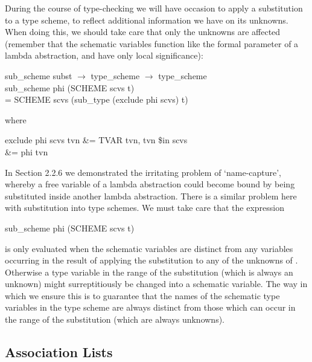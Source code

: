 During the course of type-checking we will have occasion to apply a
substitution to a type scheme, to reflect additional information we have on its
unknowns. When doing this, we should take care that only the unknowns are
affected (remember that the schematic variables function like the formal
parameter of a lambda abstraction, and have only local significance):
\begin{mlcoded}
    sub\_scheme \hastype{} subst $\rightarrow$ type\_scheme $\rightarrow$ type\_scheme \\
    sub\_scheme phi (SCHEME scvs t)\\
    \phantom{XXXX} = SCHEME scvs (sub\_type (exclude phi scvs) t)
\end{mlcoded}
where
\begin{mlalign}
    exclude phi scvs tvn &= TVAR tvn, \quad tvn \$in scvs\\
    &= phi tvn
\end{mlalign}

In Section 2.2.6 we demonstrated the irritating problem of `name-capture',
whereby a free variable of a lambda abstraction could become bound by being
substituted inside another lambda abstraction. There is a similar problem
here with substitution into type schemes. We must take care that the
expression
\begin{mlcoded}
    sub\_scheme phi (SCHEME scvs t)
\end{mlcoded}
is only evaluated when the schematic variables  are distinct from any
variables occurring in the result of applying the substitution  to any of the
unknowns of . Otherwise a type variable in the range of the substitution
(which is always an unknown) might surreptitiously be changed into a
schematic variable. The way in which we ensure this is to guarantee that
the names of the schematic type variables in the type scheme are always
distinct from those which can occur in the range of the substitution (which are
always unknowns).

\subsection{Association Lists}

